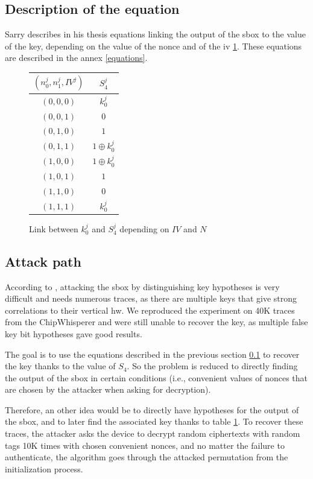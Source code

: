 \documentclass[11pt,technote]{IEEEtran}
\begin{document}
		\subsection{Description of the equation} \label{sec_equ}
		Sarry \cite{these} describes in his thesis equations linking the output of the \ac{sbox} to the value of the key, depending on the value of the nonce and of the \ac{iv} \ref{link_k_s4}. These equations are described in the annex \ref{equations}.
		
		\begin{figure}[h]
			\centering
			\begin{tabular}{|c|c|}
				\hline
				$(n_0^j,n_1^j,IV^j)$&$S_4^j$\\
				\hline\hline
				$(0,0,0)$&$k_0^j$\\
				\hline
				$(0,0,1)$&$0$\\
				\hline
				$(0,1,0)$&$1$\\
				\hline
				$(0,1,1)$&$1 \oplus k_0^j$\\
				\hline
				$(1,0,0)$&$1 \oplus k_0^j$\\
				\hline
				$(1,0,1)$&$1$\\
				\hline
				$(1,1,0)$&$0$\\
				\hline
				$(1,1,1)$&$k_0^j$\\
				\hline
			\end{tabular}
			\caption{Link between $k_0^j$ and $S_4^j$ depending on $IV$ and $N$}
			\label{link_k_s4}
		\end{figure}
		
		\subsection{Attack path}
		According to \cite{cpa_analysis}, attacking the \ac{sbox} by distinguishing key hypotheses is very difficult and needs numerous traces, as there are multiple keys that give strong correlations to their vertical \ac{hw}. We reproduced the experiment on 40K traces from the ChipWhisperer and were still unable to recover the key, as multiple false key bit hypotheses gave good results.
		
		The goal is to use the equations described in the previous section \ref{sec_equ} to recover the key thanks to the value of $S_4$. So the problem is reduced to directly finding the output of the \ac{sbox} in certain conditions (i.e., convenient values of nonces that are chosen by the attacker when asking for decryption). 
		
		Therefore, an other idea would be to directly have hypotheses for the output of the \ac{sbox}, and to later find the associated key thanks to table \ref{link_k_s4}. To recover these traces, the attacker asks the device to decrypt random ciphertexts with random tags 10K times with chosen convenient nonces, and no matter the failure to authenticate, the algorithm goes through the attacked permutation from the initialization process.
		
\end{document}
